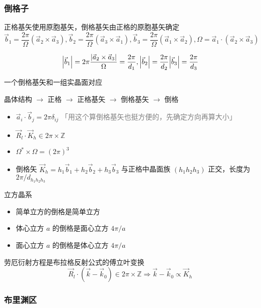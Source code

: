 \subsubsection{倒格子}

正格基矢使用原胞基矢，倒格基矢由正格的原胞基矢确定
\[ \vec{b}_1 = \frac{2 \pi}{\Omega} (\vec{a}_2 \times \vec{a}_3), \vec{b}_2 = \frac{2 \pi}{\Omega} (\vec{a}_3 \times \vec{a}_1), \vec{b}_3 = \frac{2 \pi}{\Omega} (\vec{a}_1 \times \vec{a}_2), \Omega = \vec{a}_1 \cdot (\vec{a}_2 \times \vec{a}_3) \]

\[ \abs{\vec{b}_1} = 2 \pi \frac{\abs{\vec{a}_2 \times \vec{a}_3}}{\Omega} = \frac{2 \pi}{d_1}, \abs{\vec{b}_2} = \frac{2 \pi}{d_2} \abs{\vec{b}_3} = \frac{2 \pi}{d_3} \]

一个倒格基矢和一组实晶面对应

\begin{center}
    晶体结构 $\to$ 正格 $\to$ 正格基矢 $\to$ 倒格基矢 $\to$ 倒格
\end{center}

\begin{itemize}
    \item $\vec{a}_i \cdot \vec{b}_j = 2 \pi \delta_{i j}$ \textcolor{gray}{「用这个算倒格基矢也挺方便的，先确定方向再算大小」}
    \item $\vec{R}_{l} \cdot \vec{K}_{h} \in 2 \pi \times \mathbb{Z}$
    \item $\Omega^{*} \times \Omega = (2 \pi)^3$
    \item 倒格矢 $\vec{K}_{h} = h_{1} \vec{b}_{1} + h_{2} \vec{b}_{2} + h_{3} \vec{b}_{3}$ 与正格中晶面族 $(h_{1} h_{2} h_{3})$ 正交，长度为 ${2 \pi} / d_{h_{1} h_{2} h_{3}}$
\end{itemize}

立方晶系
\begin{itemize}
    \item 简单立方的倒格是简单立方
    \item 体心立方 $a$ 的倒格是面心立方 $4 \pi / a$
    \item 面心立方 $a$ 的倒格是体心立方 $4 \pi / a$
\end{itemize}

劳厄衍射方程是布拉格反射公式的傅立叶变换
\[ \vec{R}_{l} \cdot (\vec{k} - \vec{k}_{0}) \in 2 \pi \times \mathbb{Z} \Rightarrow \vec{k} - \vec{k}_{0} \propto \vec{K}_{h} \]

\subsubsection{布里渊区}

